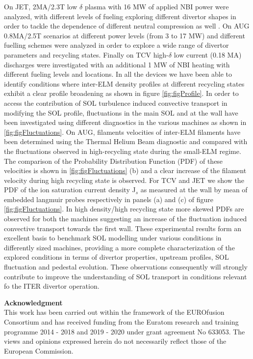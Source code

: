 \documentclass[12pt, a4paper, twoside]{article}
\begin{document}
On JET, 2MA/2.3T low $\delta$ plasma with 16 MW of
applied NBI power were analyzed, with different levels of fueling exploring different divertor shapes
in order to tackle the dependence of different neutral compression as well
\cite{Tamain:2015cx}.
On AUG 0.8MA/2.5T scenarios at different power levels (from 3 to 17 MW) and different fuelling
schemes were analyzed in order to explore a wide range of divertor
parameters and recycling states.
Finally on TCV high-$\delta$ low current (0.18 MA)
discharges were investigated with an additional 1 MW of NBI heating
with different fueling levels and locations. In all the devices we have been able to
identify conditions where inter-ELM density profiles at different recycling states exhibit a clear profile broadening as shown in
figure \ref{fig:figProfile}. In order to access the contribution of SOL
turbulence induced convective transport in modifying the SOL profile,
fluctuations in the main SOL and at the wall have been investigated
using different diagnostics in the various machines as shown in
\ref{fig:figFluctuations}. On AUG,  filaments velocities of
inter-ELM filaments have been determined using the Thermal Helium Beam
diagnostic \cite{Griener:20183cf} and compared with the fluctuations
observed in high-recycling state during the small-ELM regime. The
comparison of the Probability Distribution Function (PDF) of these velocities is shown in
\ref{fig:figFluctuations} (b) and a clear increase of the filament velocity
during high recycling state is observed. For TCV and JET we show the
PDF of the ion saturation current
density J$_s$ as measured at the wall by mean of embedded langmuir
probes respectively in panels (a) and (c) of figure
\ref{fig:figFluctuations}.
In high density/high recycling state more skewed PDFs are
observed for both the machines suggesting an increase of the
fluctuation induced convective transport towards the first wall.
These experimental results form an excellent basis to benchmark SOL
modelling under various conditions in differently sized machines,
providing a more complete characterization of the
explored conditions in terms of divertor properties, upstream
profiles, SOL fluctuation and pedestal evolution. These observations
consequently will strongly contribute to improve
the understanding of SOL transport in conditions relevant fo the ITER divertor operation.

\begingroup
{}
{\footnotesize\textbf{Acknowledgment}\\
This work has been carried out within the framework of the EUROfusion Consortium and has received funding from the Euratom research and training programme 2014 - 2018 and 2019 - 2020 under grant agreement No 633053. The views and opinions expressed herein do not necessarily reflect those of the European Commission.}
\begin{multicols}{2}
\setlength\bibitemsep{0pt}
\printbibliography[heading=none]
\end{multicols}
\endgroup
\end{document}
